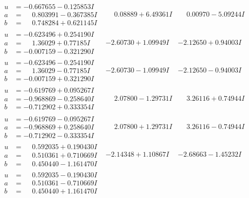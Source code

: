 \documentclass[1p]{elsarticle_modified}
\theoremstyle{definition}
\begin{document}
$$\begin{array}{c|c|c}
\begin{aligned}
u &= -0.667655 - 0.125853 I \\
a &= \phantom{-}0.803991 - 0.367385 I \\
b &= \phantom{-}0.748284 + 0.621145 I\end{aligned}
 & \phantom{-}0.08889 + 6.49361 I & \phantom{-}0.00970 - 5.09244 I \\ \hline\begin{aligned}
u &= -0.623496 + 0.254190 I \\
a &= \phantom{-}1.36029 + 0.77185 I \\
b &= -0.007159 - 0.321290 I\end{aligned}
 & -2.60730 + 1.09949 I & -2.12650 + 0.94003 I \\ \hline\begin{aligned}
u &= -0.623496 - 0.254190 I \\
a &= \phantom{-}1.36029 - 0.77185 I \\
b &= -0.007159 + 0.321290 I\end{aligned}
 & -2.60730 - 1.09949 I & -2.12650 - 0.94003 I \\ \hline\begin{aligned}
u &= -0.619769 + 0.095267 I \\
a &= -0.968869 - 0.258640 I \\
b &= -0.712902 + 0.333354 I\end{aligned}
 & \phantom{-}2.07800 - 1.29731 I & \phantom{-}3.26116 + 0.74944 I \\ \hline\begin{aligned}
u &= -0.619769 - 0.095267 I \\
a &= -0.968869 + 0.258640 I \\
b &= -0.712902 - 0.333354 I\end{aligned}
 & \phantom{-}2.07800 + 1.29731 I & \phantom{-}3.26116 - 0.74944 I \\ \hline\begin{aligned}
u &= \phantom{-}0.592035 + 0.190430 I \\
a &= \phantom{-}0.510361 + 0.710669 I \\
b &= \phantom{-}0.450440 - 1.161470 I\end{aligned}
 & -2.14348 + 1.10867 I & -2.68663 - 1.45232 I \\ \hline\begin{aligned}
u &= \phantom{-}0.592035 - 0.190430 I \\
a &= \phantom{-}0.510361 - 0.710669 I \\
b &= \phantom{-}0.450440 + 1.161470 I\end{aligned}

\end{array}$$
\end{document}
